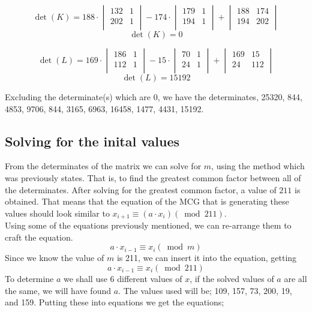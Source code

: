 \documentclass[12pft, english]{article}
\begin{document}
\begin{multicols}{2}
  \[
    \det(K) =
    188 \cdot
    \begin{vmatrix}
      132 & 1 \\
      202 & 1 \\
    \end{vmatrix}
    -
    174 \cdot
    \begin{vmatrix}
      179 & 1 \\
      194 & 1 \\
    \end{vmatrix}
    +
    \begin{vmatrix}
      188 & 174 \\
      194 & 202 \\
    \end{vmatrix}
  \]
  \[
    \det(K) = 0
  \]

  \[
    \det(L) =
    169 \cdot
    \begin{vmatrix}
      186 & 1 \\
      112 & 1 \\
    \end{vmatrix}
    -
    15 \cdot
    \begin{vmatrix}
      70 & 1 \\
      24 & 1 \\
    \end{vmatrix}
    +
    \begin{vmatrix}
      169 & 15 \\
      24 & 112 \\
    \end{vmatrix}
  \]
  \[
    \det(L) = 15192
  \]

  Excluding the determinate(s) which are 0, we have the determinates, 25320, 844, 4853, 9706, 844, 3165, 6963, 16458, 1477, 4431, 15192.

  \subsection{Solving for the inital values}

  From the determinates of the matrix we can solve for \(m\), using the method which was previously states. That is, to find the greatest common factor between all of the determinates. After solving for the greatest common factor, a value of \(211\) is obtained. That means that the equation of the MCG that is generating these values should look similar to \(x_{i+1} \equiv (a \cdot x_{i}) (\bmod {211})\). \\
  Using some of the equations previously mentioned, we can re-arrange them to craft the equation. \cite{reteamHal}
  \[ a \cdot x_{i - 1} \equiv x_{i} ( \bmod m )\]
  Since we know the value of \(m\) is 211, we can insert it into the equation, getting
  \[a \cdot x_{i-1} \equiv x_{i} (\bmod 211)\]
  To determine \(a\) we shall use 6 different values of \(x\), if the solved values of \(a\) are all the same, we will have found \(a\). The values used will be; 109, 157, 73, 200, 19, and 159. Putting these into equations we get the equations;


\end{multicols}
\end{document}
